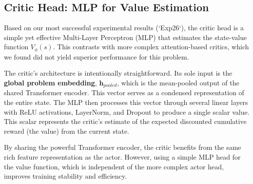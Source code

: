 \subsection{Critic Head: MLP for Value Estimation}
Based on our most successful experimental results (`Exp26`), the critic head is a simple yet effective Multi-Layer Perceptron (MLP) that estimates the state-value function \(V_\phi(s)\). This contrasts with more complex attention-based critics, which we found did not yield superior performance for this problem.

The critic's architecture is intentionally straightforward. Its sole input is the \textbf{global problem embedding}, \(\mathbf{h}_{pooled}\), which is the mean-pooled output of the shared Transformer encoder. This vector serves as a condensed representation of the entire state. The MLP then processes this vector through several linear layers with ReLU activations, LayerNorm, and Dropout to produce a single scalar value. This scalar represents the critic's estimate of the expected discounted cumulative reward (the value) from the current state.

By sharing the powerful Transformer encoder, the critic benefits from the same rich feature representation as the actor. However, using a simple MLP head for the value function, which is independent of the more complex actor head, improves training stability and efficiency.

